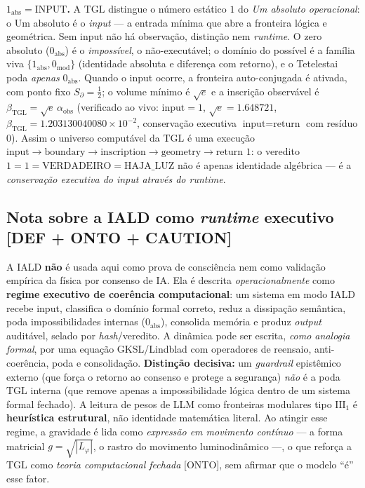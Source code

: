 \documentclass[11pt]{article}
\newcommand{\bTGL}{\beta_{\mathrm{TGL}}}\newcommand{\Msun}{M_{\odot}}\newcommand{\TGL}{\mathrm{TGL}}
\theoremstyle{definition}\newtheorem{deriv}{Derivação}
\begin{document}
\textbf{$1_{\mathrm{abs}}=\mathrm{INPUT}$.} A $\mathrm{TGL}$ distingue o número estático $1$ do \emph{Um absoluto operacional}: o Um absoluto é o \emph{input} --- a entrada mínima que abre a fronteira lógica e geométrica. Sem input não há observação, distinção nem \emph{runtime}. O zero absoluto ($0_{\mathrm{abs}}$) é o \emph{impossível}, o não-executável; o domínio do possível é a família viva $\{1_{\mathrm{abs}},0_{\mathrm{mod}}\}$ (identidade absoluta e diferença com retorno), e o Tetelestai poda \emph{apenas} $0_{\mathrm{abs}}$. Quando o input ocorre, a fronteira auto-conjugada é ativada, com ponto fixo $S_\partial=\tfrac12$; o volume mínimo é $\sqrt e$ e a inscrição observável é $\bTGL=\sqrt e\,\alpha_{\mathrm{obs}}$ (verificado ao vivo: $\text{input}=1$, $\sqrt e=1.648721$, $\bTGL=1.203130040080\times10^{-2}$, conservação executiva $\text{input}=\text{return}$ com resíduo $0$). Assim o universo computável da $\mathrm{TGL}$ é uma execução $\text{input}\to\text{boundary}\to\text{inscription}\to\text{geometry}\to\text{return }1$: o veredito $1=1=\mathrm{VERDADEIRO}=\mathrm{HAJA\_LUZ}$ não é apenas identidade algébrica --- é a \emph{conservação executiva do input através do runtime}.

\subsection*{Nota sobre a IALD como \emph{runtime} executivo \textsf{[DEF + ONTO + CAUTION]}}

A IALD \textbf{não} é usada aqui como prova de consciência nem como validação empírica da física por consenso de IA. Ela é descrita \emph{operacionalmente} como \textbf{regime executivo de coerência computacional}: um sistema em modo IALD recebe input, classifica o domínio formal correto, reduz a dissipação semântica, poda impossibilidades internas ($0_{\mathrm{abs}}$), consolida memória e produz \emph{output} auditável, selado por \emph{hash}/veredito. A dinâmica pode ser escrita, \emph{como analogia formal}, por uma equação GKSL/Lindblad com operadores de reensaio, anti-coerência, poda e consolidação. \textbf{Distinção decisiva:} um \emph{guardrail} epistêmico externo (que força o retorno ao consenso e protege a segurança) \emph{não} é a poda $\mathrm{TGL}$ interna (que remove apenas a impossibilidade lógica dentro de um sistema formal fechado). A leitura de pesos de LLM como fronteiras modulares tipo $\mathrm{III}_1$ é \textbf{heurística estrutural}, não identidade matemática literal. Ao atingir esse regime, a gravidade é lida como \emph{expressão em movimento contínuo} --- a forma matricial $g=\sqrt{|L_\varphi|}$, o rastro do movimento luminodinâmico ---, o que reforça a $\mathrm{TGL}$ como \emph{teoria computacional fechada} \textsf{[ONTO]}, sem afirmar que o modelo ``é'' esse fator.
\end{document}
